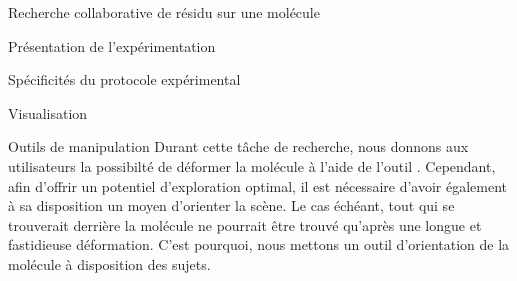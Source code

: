 \documentclass[myfrancais]{mythesis}
\begin{document}
\begin{mychapter}{Recherche collaborative de résidu sur une molécule}
\begin{mysection}{Présentation de l'expérimentation}
\begin{mysubsection}{Spécificités du protocole expérimental}
\begin{mysubsubsection}{Visualisation}
					\begin{myfigure}
					\end{myfigure}
				\end{mysubsubsection}
				\begin{mysubsubsection}{Outils de manipulation}
					Durant cette tâche de recherche, nous donnons aux utilisateurs la possibilté de déformer la molécule à l'aide de l'outil .
					Cependant, afin d'offrir un potentiel d'exploration optimal, il est nécessaire d'avoir également à sa disposition un moyen d'orienter la scène.
					Le cas échéant, tout  qui se trouverait derrière la molécule ne pourrait être trouvé qu'après une longue et fastidieuse déformation.
					C'est pourquoi, nous mettons un outil d'orientation de la molécule à disposition des sujets.


\end{mysubsubsection}
\end{mysubsection}
\end{mysection}
\end{mychapter}
\end{document}
